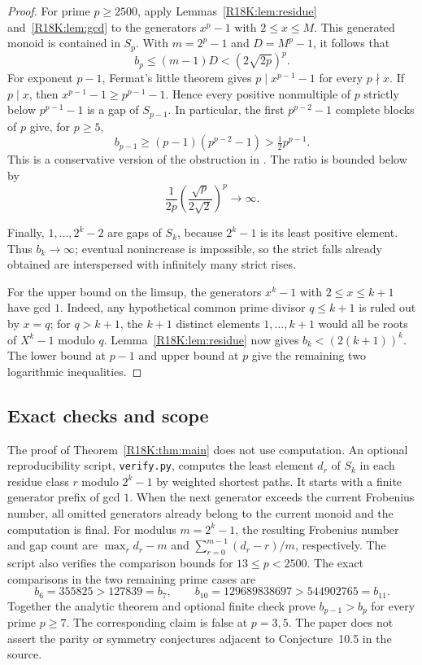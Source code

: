 \documentclass[11pt,a4paper]{article}
\begin{document}
\begin{proof}
For prime \(p\ge2500\), apply Lemmas~\ref{R18K:lem:residue}
and~\ref{R18K:lem:gcd} to the generators \(x^p-1\) with \(2\le x\le M\).
This generated monoid is contained in \(S_p\). With
\(m=2^p-1\) and \(D=M^p-1\), it follows that
\[
 b_p\le (m-1)D < (2\sqrt{2p})^p.
\]
For exponent \(p-1\), Fermat's little theorem gives
\(p\mid x^{p-1}-1\) for every \(p\nmid x\).
If \(p\mid x\), then \(x^{p-1}-1\ge p^{p-1}-1\).
Hence every positive nonmultiple of \(p\) strictly below
\(p^{p-1}-1\) is a gap of \(S_{p-1}\).
In particular, the first \(p^{p-2}-1\) complete blocks of \(p\)
give, for \(p\ge5\),
\[
 b_{p-1}\ge(p-1)(p^{p-2}-1)>\tfrac12 p^{p-1}.
\]
This is a conservative version of the obstruction in
\cite[Theorem~10.7]{R18K:BL}. The ratio is bounded below by
\[
 \frac1{2p}\left(\frac{\sqrt p}{2\sqrt2}\right)^p\longrightarrow\infty.
\]

Finally, \(1,\ldots,2^k-2\) are gaps of \(S_k\),
because \(2^k-1\) is its least positive element.
Thus \(b_k\to\infty\); eventual nonincrease is impossible,
so the strict falls already obtained are interspersed with
infinitely many strict rises.

For the upper bound on the limsup, the generators \(x^k-1\)
with \(2\le x\le k+1\) have gcd \(1\).
Indeed, any hypothetical common prime divisor \(q\le k+1\)
is ruled out by \(x=q\); for \(q>k+1\), the \(k+1\) distinct
elements \(1,\ldots,k+1\) would all be roots of \(X^k-1\) modulo \(q\).
Lemma~\ref{R18K:lem:residue} now gives \(b_k<(2(k+1))^k\).
The lower bound at \(p-1\) and upper bound at \(p\) give the
remaining two logarithmic inequalities.
\end{proof}

\subsection{Exact checks and scope}

The proof of Theorem~\ref{R18K:thm:main} does not use computation.
An optional reproducibility script, \texttt{verify.py}, computes
the least element \(d_r\) of \(S_k\) in each residue class \(r\)
modulo \(2^k-1\) by weighted shortest paths. It starts with a
finite generator prefix of gcd \(1\). When the next generator
exceeds the current Frobenius number, all omitted generators
already belong to the current monoid and the computation is final.
For modulus \(m=2^k-1\), the resulting Frobenius number and gap
count are \(\max_r d_r-m\) and
\(\sum_{r=0}^{m-1}(d_r-r)/m\), respectively.
The script also verifies the comparison bounds for
\(13\le p<2500\). The exact comparisons in the two remaining
prime cases are
\[
 b_6=355825>127839=b_7,\qquad
 b_{10}=129689838697>544902765=b_{11}.
\]
Together the analytic theorem and optional finite check prove
\(b_{p-1}>b_p\) for every prime \(p\ge7\).
The corresponding claim is false at \(p=3,5\).
The paper does not assert the parity or symmetry conjectures
adjacent to Conjecture~10.5 in the source.
\endgroup
\end{document}
